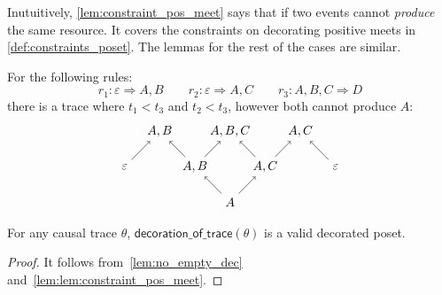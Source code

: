 Inutuitively, \autoref{lem:constraint_pos_meet} says that if two events cannot \emph{produce} the same resource. It covers the constraints on decorating positive meets in \autoref{def:constraints_poset}. The lemmas for the rest of the cases are similar.

\begin{example}
  For the following rules:
  \[
  r_1:\varepsilon \Rightarrow A,B \qquad r_2: \varepsilon \Rightarrow A,C \qquad r_3: A,B,C \Rightarrow D
  \]
  there is a trace where $t_1<t_3$ and $t_2<t_3$, however both cannot produce $A$:
    \[
    \begin{tikzpicture} %
      \node (o) at (0,-1) {\(A\)};
      \node (r3) at (0,1) {\(A,B,C\)};
      \node (o1) at (-1,0) {\(A,B\)};
      \node (o2) at (1,0) {\(A,C\)};
      \node (r1) at (-2,1) {\(A,B\)};
      \node (r2) at (2,1) {\(A,C\)};
      \node (k1) at (-3,0) {\(\varepsilon\)};
      \node (k2) at (3,0) {\(\varepsilon\)};
      \draw [->] (o) -- (o1);
      \draw [->] (o) -- (o2);
      \draw [->] (o1) -- (r3);
      \draw [->] (o2) -- (r3);
      \draw [->] (o1) -- (r1);
      \draw [->] (o2) -- (r2);
      \draw [->] (k1) -- (r1);
      \draw [->] (k2) -- (r2);
    \end{tikzpicture}
    \]
\end{example}

\begin{lemma}
  \label{prop:app_constraints_poset}
  For any causal trace $\theta$, $\mathsf{decoration\_of\_trace}(\theta)$ is a valid decorated poset.
\end{lemma}
\begin{proof}
  It follows from~\autoref{lem:no_empty_dec} and~\autoref{lem:lem:constraint_pos_meet}.
\end{proof}
